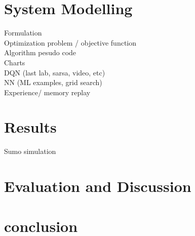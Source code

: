 \documentclass[conference]{IEEEtran}
\begin{document}
\section{System Modelling}
Formulation \\
Optimization problem / objective function \\
Algorithm pesudo code\\
Charts \\
DQN (last lab, sarsa, video, etc) \\
NN (ML examples, grid search)\\
Experience/ memory replay \\

\section{Results}
Sumo simulation

\section{Evaluation and Discussion}

\section{conclusion}




\end{document}
